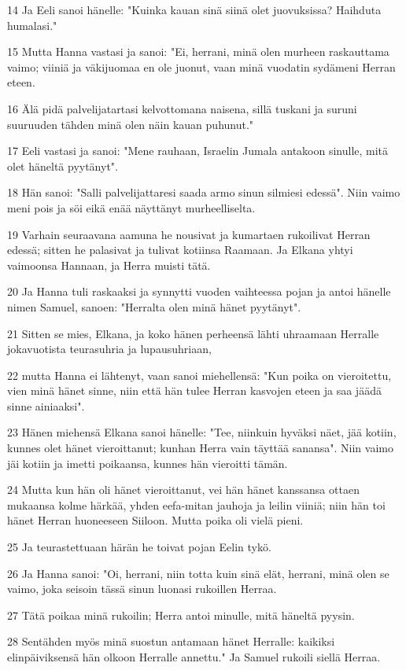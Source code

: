 \par 14 Ja Eeli sanoi hänelle: "Kuinka kauan sinä siinä olet juovuksissa? Haihduta humalasi."
\par 15 Mutta Hanna vastasi ja sanoi: "Ei, herrani, minä olen murheen raskauttama vaimo; viiniä ja väkijuomaa en ole juonut, vaan minä vuodatin sydämeni Herran eteen.
\par 16 Älä pidä palvelijatartasi kelvottomana naisena, sillä tuskani ja suruni suuruuden tähden minä olen näin kauan puhunut."
\par 17 Eeli vastasi ja sanoi: "Mene rauhaan, Israelin Jumala antakoon sinulle, mitä olet häneltä pyytänyt".
\par 18 Hän sanoi: "Salli palvelijattaresi saada armo sinun silmiesi edessä". Niin vaimo meni pois ja söi eikä enää näyttänyt murheelliselta.
\par 19 Varhain seuraavana aamuna he nousivat ja kumartaen rukoilivat Herran edessä; sitten he palasivat ja tulivat kotiinsa Raamaan. Ja Elkana yhtyi vaimoonsa Hannaan, ja Herra muisti tätä.
\par 20 Ja Hanna tuli raskaaksi ja synnytti vuoden vaihteessa pojan ja antoi hänelle nimen Samuel, sanoen: "Herralta olen minä hänet pyytänyt".
\par 21 Sitten se mies, Elkana, ja koko hänen perheensä lähti uhraamaan Herralle jokavuotista teurasuhria ja lupausuhriaan,
\par 22 mutta Hanna ei lähtenyt, vaan sanoi miehellensä: "Kun poika on vieroitettu, vien minä hänet sinne, niin että hän tulee Herran kasvojen eteen ja saa jäädä sinne ainiaaksi".
\par 23 Hänen miehensä Elkana sanoi hänelle: "Tee, niinkuin hyväksi näet, jää kotiin, kunnes olet hänet vieroittanut; kunhan Herra vain täyttää sanansa". Niin vaimo jäi kotiin ja imetti poikaansa, kunnes hän vieroitti tämän.
\par 24 Mutta kun hän oli hänet vieroittanut, vei hän hänet kanssansa ottaen mukaansa kolme härkää, yhden eefa-mitan jauhoja ja leilin viiniä; niin hän toi hänet Herran huoneeseen Siiloon. Mutta poika oli vielä pieni.
\par 25 Ja teurastettuaan härän he toivat pojan Eelin tykö.
\par 26 Ja Hanna sanoi: "Oi, herrani, niin totta kuin sinä elät, herrani, minä olen se vaimo, joka seisoin tässä sinun luonasi rukoillen Herraa.
\par 27 Tätä poikaa minä rukoilin; Herra antoi minulle, mitä häneltä pyysin.
\par 28 Sentähden myös minä suostun antamaan hänet Herralle: kaikiksi elinpäiviksensä hän olkoon Herralle annettu." Ja Samuel rukoili siellä Herraa.

